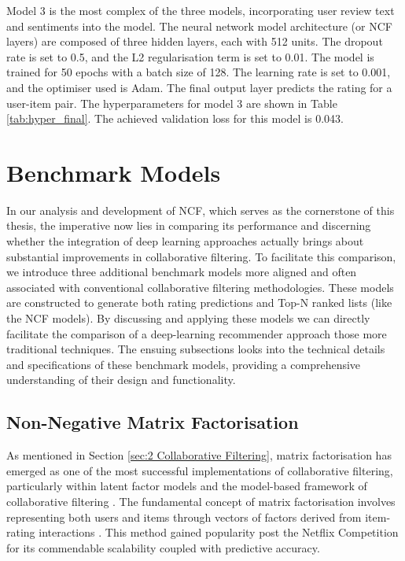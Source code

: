 Model 3 is the most complex of the three models, incorporating user review text and sentiments into the model. The neural network model architecture (or NCF layers) are composed of three hidden layers, each with 512 units. The dropout rate is set to 0.5, and the L2 regularisation term is set to 0.01. The model is trained for 50 epochs with a batch size of 128. The learning rate is set to 0.001, and the optimiser used is Adam. The final output layer predicts the rating for a user-item pair. The hyperparameters for model 3 are shown in Table \ref{tab:hyper_final}. The achieved validation loss for this model is 0.043.


\section{Benchmark Models}
\label{sec:4 Benchmark Models}

In our analysis and development of NCF, which serves as the cornerstone of this thesis, the imperative now lies in comparing its performance and discerning whether the integration of deep learning approaches actually brings about substantial improvements in collaborative filtering. To facilitate this comparison, we introduce three additional benchmark models more aligned and often associated with conventional collaborative filtering methodologies. These models are constructed to generate both rating predictions and Top-N ranked lists (like the NCF models). By discussing and applying these models we can directly facilitate the comparison of a deep-learning recommender approach those more traditional techniques. The ensuing subsections looks into the technical details and specifications of these benchmark models, providing a comprehensive understanding of their design and functionality.


\subsection{Non-Negative Matrix Factorisation}
\label{subsec:4 Non-Negative Matrix Factorisation}

As mentioned in Section \ref{sec:2 Collaborative Filtering}, matrix factorisation has emerged as one of the most successful implementations of collaborative filtering, particularly within latent factor models and the model-based framework of collaborative filtering \cite{koren2009collaborative}. The fundamental concept of matrix factorisation involves representing both users and items through vectors of factors derived from item-rating interactions \cite{koren2009collaborative}. This method gained popularity post the Netflix Competition for its commendable scalability coupled with predictive accuracy. 


